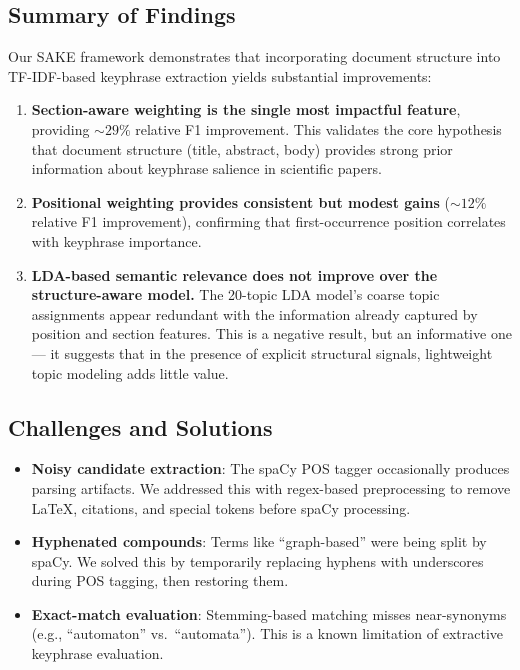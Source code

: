 \documentclass[pdflatex,sn-mathphys-num]{sn-jnl}
\begin{document}
\subsection{Summary of Findings}

Our SAKE framework demonstrates that incorporating document structure into TF-IDF-based keyphrase
extraction yields substantial improvements:

\begin{enumerate}
  \item \textbf{Section-aware weighting is the single most impactful feature}, providing
        ${\sim}29\%$ relative F1 improvement. This validates the core hypothesis that document
        structure (title, abstract, body) provides strong prior information about keyphrase salience
        in scientific papers.
  \item \textbf{Positional weighting provides consistent but modest gains} (${\sim}12\%$ relative F1
        improvement), confirming that first-occurrence position correlates with keyphrase importance.
  \item \textbf{LDA-based semantic relevance does not improve over the structure-aware model.} The
        20-topic LDA model's coarse topic assignments appear redundant with the information already
        captured by position and section features. This is a negative result, but an informative one
        --- it suggests that in the presence of explicit structural signals, lightweight topic
        modeling adds little value.
\end{enumerate}

\subsection{Challenges and Solutions}

\begin{itemize}
  \item \textbf{Noisy candidate extraction}: The spaCy POS tagger occasionally produces parsing
        artifacts. We addressed this with regex-based preprocessing to remove \LaTeX{}, citations,
        and special tokens before spaCy processing.
  \item \textbf{Hyphenated compounds}: Terms like ``graph-based'' were being split by spaCy. We
        solved this by temporarily replacing hyphens with underscores during POS tagging, then
        restoring them.
  \item \textbf{Exact-match evaluation}: Stemming-based matching misses near-synonyms (e.g.,
        ``automaton'' vs.\ ``automata''). This is a known limitation of extractive keyphrase
        evaluation.
\end{itemize}
\end{document}
